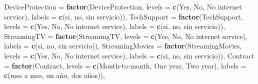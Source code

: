 \documentclass[
]{article}
\newenvironment{Shaded}{\begin{snugshade}}{\end{snugshade}}
\newcommand{\AttributeTok}[1]{\textcolor[rgb]{0.13,0.29,0.53}{#1}}
\newcommand{\FunctionTok}[1]{\textcolor[rgb]{0.13,0.29,0.53}{\textbf{#1}}}
\newcommand{\NormalTok}[1]{#1}
\newcommand{\StringTok}[1]{\textcolor[rgb]{0.31,0.60,0.02}{#1}}
\begin{document}
\begin{Shaded}
\begin{Highlighting}[]
    \AttributeTok{DeviceProtection =} \FunctionTok{factor}\NormalTok{(DeviceProtection, }\AttributeTok{levels =} \FunctionTok{c}\NormalTok{(}\StringTok{\textquotesingle{}Yes\textquotesingle{}}\NormalTok{, }\StringTok{\textquotesingle{}No\textquotesingle{}}\NormalTok{, }\StringTok{\textquotesingle{}No internet service\textquotesingle{}}\NormalTok{), }\AttributeTok{labels =} \FunctionTok{c}\NormalTok{(}\StringTok{\textquotesingle{}si\textquotesingle{}}\NormalTok{, }\StringTok{\textquotesingle{}no\textquotesingle{}}\NormalTok{, }\StringTok{\textquotesingle{}sin servicio\textquotesingle{}}\NormalTok{)),}
    \AttributeTok{TechSupport =} \FunctionTok{factor}\NormalTok{(TechSupport, }\AttributeTok{levels =} \FunctionTok{c}\NormalTok{(}\StringTok{\textquotesingle{}Yes\textquotesingle{}}\NormalTok{, }\StringTok{\textquotesingle{}No\textquotesingle{}}\NormalTok{, }\StringTok{\textquotesingle{}No internet service\textquotesingle{}}\NormalTok{), }\AttributeTok{labels =} \FunctionTok{c}\NormalTok{(}\StringTok{\textquotesingle{}si\textquotesingle{}}\NormalTok{, }\StringTok{\textquotesingle{}no\textquotesingle{}}\NormalTok{, }\StringTok{\textquotesingle{}sin servicio\textquotesingle{}}\NormalTok{)),}
    \AttributeTok{StreamingTV =} \FunctionTok{factor}\NormalTok{(StreamingTV, }\AttributeTok{levels =} \FunctionTok{c}\NormalTok{(}\StringTok{\textquotesingle{}Yes\textquotesingle{}}\NormalTok{, }\StringTok{\textquotesingle{}No\textquotesingle{}}\NormalTok{, }\StringTok{\textquotesingle{}No internet service\textquotesingle{}}\NormalTok{), }\AttributeTok{labels =} \FunctionTok{c}\NormalTok{(}\StringTok{\textquotesingle{}si\textquotesingle{}}\NormalTok{, }\StringTok{\textquotesingle{}no\textquotesingle{}}\NormalTok{, }\StringTok{\textquotesingle{}sin servicio\textquotesingle{}}\NormalTok{)),}
    \AttributeTok{StreamingMovies =} \FunctionTok{factor}\NormalTok{(StreamingMovies, }\AttributeTok{levels =} \FunctionTok{c}\NormalTok{(}\StringTok{\textquotesingle{}Yes\textquotesingle{}}\NormalTok{, }\StringTok{\textquotesingle{}No\textquotesingle{}}\NormalTok{, }\StringTok{\textquotesingle{}No internet service\textquotesingle{}}\NormalTok{), }\AttributeTok{labels =} \FunctionTok{c}\NormalTok{(}\StringTok{\textquotesingle{}si\textquotesingle{}}\NormalTok{, }\StringTok{\textquotesingle{}no\textquotesingle{}}\NormalTok{, }\StringTok{\textquotesingle{}sin servicio\textquotesingle{}}\NormalTok{)),}
    \AttributeTok{Contract =} \FunctionTok{factor}\NormalTok{(Contract, }\AttributeTok{levels =} \FunctionTok{c}\NormalTok{(}\StringTok{\textquotesingle{}Month{-}to{-}month\textquotesingle{}}\NormalTok{, }\StringTok{\textquotesingle{}One year\textquotesingle{}}\NormalTok{, }\StringTok{\textquotesingle{}Two year\textquotesingle{}}\NormalTok{), }\AttributeTok{labels =} \FunctionTok{c}\NormalTok{(}\StringTok{\textquotesingle{}mes a mes\textquotesingle{}}\NormalTok{, }\StringTok{\textquotesingle{}un año\textquotesingle{}}\NormalTok{, }\StringTok{\textquotesingle{}dos años\textquotesingle{}}\NormalTok{)),}

\end{Highlighting}
\end{Shaded}
\end{document}
